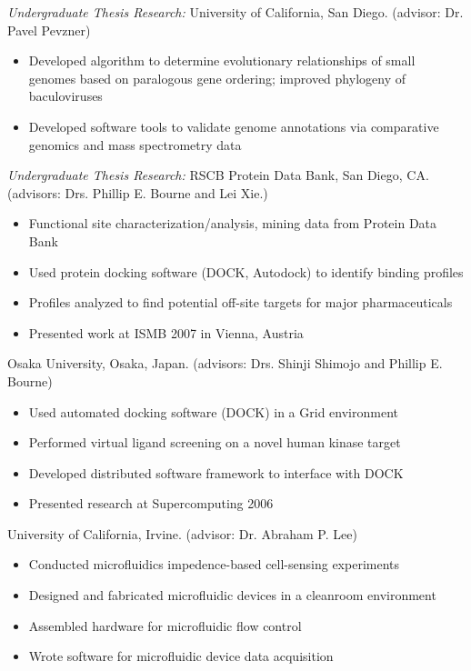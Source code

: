 \documentclass[11pt, letterpaper]{article}
\newcommand{\years}[1]{\marginnote{\scriptsize #1}}
\begin{document}
\noindent\years{2005-2008}
\emph{Undergraduate Thesis Research:} University of California, San Diego. (advisor: Dr. Pavel Pevzner)
\begin{itemize}
    \item Developed algorithm to determine evolutionary relationships of small genomes based on paralogous gene ordering; improved phylogeny of baculoviruses
    \item Developed software tools to validate genome annotations via comparative genomics and mass spectrometry data
\end{itemize}

\noindent\years{2007-2008}
\emph{Undergraduate Thesis Research:} RSCB Protein Data Bank, San Diego, CA. (advisors: Drs. Phillip E. Bourne and Lei Xie.)
\begin{itemize}
    \item Functional site characterization/analysis, mining data from Protein Data Bank
    \item Used protein docking software (DOCK, Autodock) to identify binding profiles
    \item Profiles analyzed to find potential off-site targets for major pharmaceuticals
    \item Presented work at ISMB 2007 in Vienna, Austria
\end{itemize}

\noindent\years{2006}
Osaka University, Osaka, Japan. (advisors: Drs. Shinji Shimojo and Phillip E. Bourne)
\begin{itemize}
    \item Used automated docking software (DOCK) in a Grid environment
    \item Performed virtual ligand screening on a novel human kinase target
    \item Developed distributed software framework to interface with DOCK
    \item Presented research at Supercomputing 2006\\[5mm]
\end{itemize}

\noindent\years{2004-2006}
University of California, Irvine. (advisor: Dr. Abraham P. Lee)
\begin{itemize}
    \item Conducted microfluidics impedence-based cell-sensing experiments
    \item Designed and fabricated microfluidic devices in a cleanroom environment
    \item Assembled hardware for microfluidic flow control
    \item Wrote software for microfluidic device data acquisition
\end{itemize}
\end{document}
